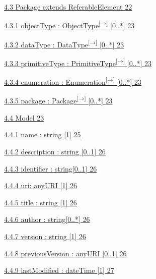 \documentclass[10pt,a4paper]{ivoa}
\begin{document}
\protect\hyperlink{package-extends-referableelement}{4.3 Package extends
ReferableElement
\protect\hyperlink{package-extends-referableelement}{22}}

\protect\hyperlink{objecttype-objecttype-0..}{4.3.1 objectType :
ObjectType\textsuperscript{{[}→{]}} {[}0..*{]}
\protect\hyperlink{objecttype-objecttype-0..}{23}}

\protect\hyperlink{datatype-datatype-0..}{4.3.2 dataType :
DataType\textsuperscript{{[}→{]}} {[}0..*{]}
\protect\hyperlink{datatype-datatype-0..}{23}}

\protect\hyperlink{primitivetype-primitivetype-0..}{4.3.3 primitiveType
: PrimitiveType\textsuperscript{{[}→{]}} {[}0..*{]}
\protect\hyperlink{primitivetype-primitivetype-0..}{23}}

\protect\hyperlink{enumeration-enumeration-0..}{4.3.4 enumeration :
Enumeration\textsuperscript{{[}→{]}} {[}0..*{]}
\protect\hyperlink{enumeration-enumeration-0..}{23}}

\protect\hyperlink{package-package-0..}{4.3.5 package :
Package\textsuperscript{{[}→{]}} {[}0..*{]}
\protect\hyperlink{package-package-0..}{23}}

\protect\hyperlink{model}{4.4 Model \protect\hyperlink{model}{23}}

\protect\hyperlink{name-string-1}{4.4.1 name : string {[}1{]}
\protect\hyperlink{name-string-1}{25}}

\protect\hyperlink{description-string-0..1-1}{4.4.2 description : string
{[}0..1{]} \protect\hyperlink{description-string-0..1-1}{26}}

\protect\hyperlink{identifier-string0..1}{4.4.3 identifier :
string{[}0..1{]} \protect\hyperlink{identifier-string0..1}{26}}

\protect\hyperlink{uri-anyuri-1}{4.4.4 uri: anyURI {[}1{]}
\protect\hyperlink{uri-anyuri-1}{26}}

\protect\hyperlink{title-string-1}{4.4.5 title : string {[}1{]}
\protect\hyperlink{title-string-1}{26}}

\protect\hyperlink{author-string0..}{4.4.6 author : string{[}0..*{]}
\protect\hyperlink{author-string0..}{26}}

\protect\hyperlink{version-string-1}{4.4.7 version : string {[}1{]}
\protect\hyperlink{version-string-1}{26}}

\protect\hyperlink{previousversion-anyuri-0..1}{4.4.8 previousVersion :
anyURI {[}0..1{]} \protect\hyperlink{previousversion-anyuri-0..1}{26}}

\protect\hyperlink{lastmodified-datetime-1}{4.4.9 lastModified :
dateTime {[}1{]} \protect\hyperlink{lastmodified-datetime-1}{27}}
\end{document}
